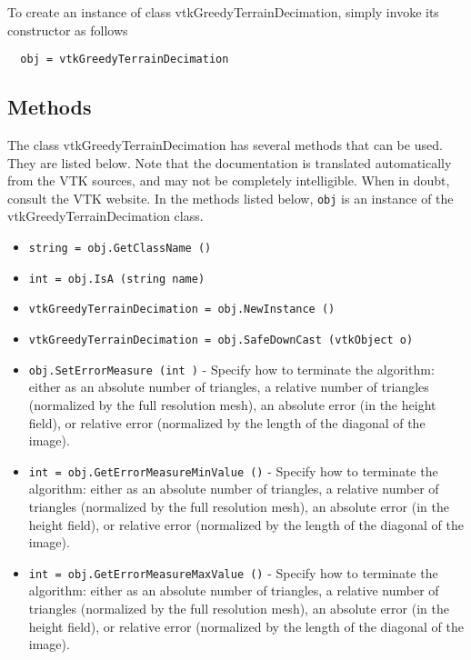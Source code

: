 To create an instance of class vtkGreedyTerrainDecimation, simply
invoke its constructor as follows
\begin{verbatim}
  obj = vtkGreedyTerrainDecimation
\end{verbatim}
\subsection{Methods}

The class vtkGreedyTerrainDecimation has several methods that can be used.
  They are listed below.
Note that the documentation is translated automatically from the VTK sources,
and may not be completely intelligible.  When in doubt, consult the VTK website.
In the methods listed below, \verb|obj| is an instance of the vtkGreedyTerrainDecimation class.
\begin{itemize}
\item  \verb|string = obj.GetClassName ()|

\item  \verb|int = obj.IsA (string name)|

\item  \verb|vtkGreedyTerrainDecimation = obj.NewInstance ()|

\item  \verb|vtkGreedyTerrainDecimation = obj.SafeDownCast (vtkObject o)|

\item  \verb|obj.SetErrorMeasure (int )| -  Specify how to terminate the algorithm: either as an absolute number of
 triangles, a relative number of triangles (normalized by the full
 resolution mesh), an absolute error (in the height field), or relative
 error (normalized by the length of the diagonal of the image).

\item  \verb|int = obj.GetErrorMeasureMinValue ()| -  Specify how to terminate the algorithm: either as an absolute number of
 triangles, a relative number of triangles (normalized by the full
 resolution mesh), an absolute error (in the height field), or relative
 error (normalized by the length of the diagonal of the image).

\item  \verb|int = obj.GetErrorMeasureMaxValue ()| -  Specify how to terminate the algorithm: either as an absolute number of
 triangles, a relative number of triangles (normalized by the full
 resolution mesh), an absolute error (in the height field), or relative
 error (normalized by the length of the diagonal of the image).


\end{itemize}
